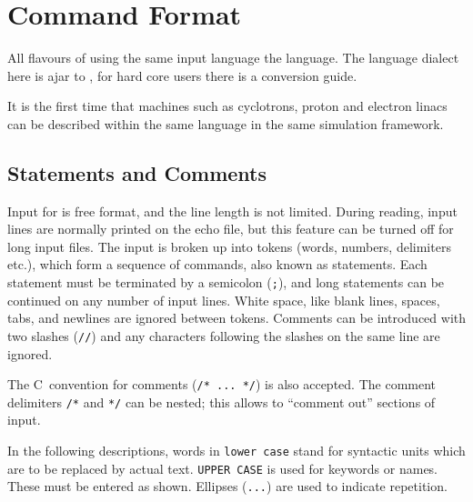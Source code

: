 \chapter{Command Format}
\label{chp:format}
All flavours of \opal using the same input language the \mad language. The language dialect here is
ajar to \madnine, for hard core \madeight users there is a conversion guide. 

 It is the first time that 
machines such as cyclotrons, proton and electron linacs can be described within the same language
in the same simulation framework.
\section{Statements and Comments}
\label{sec:statements}
Input for \opal is free format, and the line length is not limited.
During reading, input lines are normally printed on the echo file,
but this feature can be turned off for long input files.
The input is broken up into tokens (words, numbers, delimiters etc.),
which form a sequence of commands, also known as statements.
Each statement must be terminated by a semicolon (\texttt{;}),
and long statements can be continued on any number of input lines.
White space, like blank lines, spaces, tabs, 
and newlines are ignored between tokens.
Comments can be introduced with two slashes (\texttt{//}) 
and any characters following the slashes on the same line are ignored.

The C~convention for comments (\texttt{/* ... */}) is also accepted.
The comment delimiters \texttt{/*} and \texttt{*/} can be nested;
this allows to ``comment out'' sections of input.

In the following descriptions,
words in \texttt{lower case} stand for syntactic units
which are to be replaced by actual text.
\texttt{UPPER CASE} is used for keywords or names.
These must be entered as shown.
Ellipses (\texttt{...}) are used to indicate repetition.

